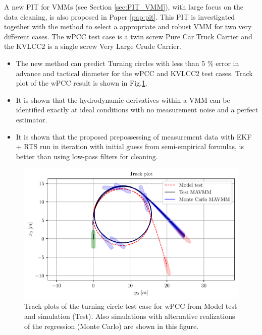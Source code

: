 \noindent A new PIT for VMMs (see Section \ref{sec:PIT_VMM}), with large focus on the data cleaning, is also proposed in Paper \ref{pap:pit}. This PIT is investigated together with the method to select a appropriate and robust VMM for two very different cases. The wPCC test case is a twin screw Pure Car Truck Carrier and the KVLCC2 is a single screw Very Large Crude Carrier.    
\begin{itemize}
    \item The new method can predict Turning circles with less than 5 \% error in advance and tactical diameter for the wPCC and KVLCC2 test cases. Track plot of the wPCC result is shown in Fig.\ref{fig:turning_circle_wpcc}.
    
    \item It is shown that the hydrodynamic derivatives within a VMM can be identified exactly at ideal conditions with no measurement noise and a perfect estimator.
    
    \item It is shown that the proposed prepossessing of measurement data with EKF + RTS run in iteration with initial guess from semi-empirical formulas, is better than using low-pass filters for cleaning.
    
\end{itemize}

\begin{figure}[H]
    \centering
    \includegraphics{kappa/images/10.pdf}
    \caption{Track plots of the turning circle test case for wPCC from Model test and simulation (Test). Also simulations with alternative realizations of the regression (Monte Carlo) are shown in this figure.}
    \label{fig:turning_circle_wpcc}
\end{figure}




